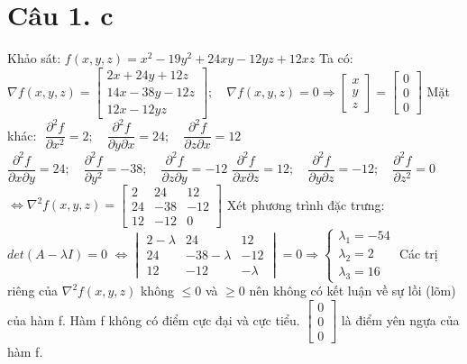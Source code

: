 \documentclass[11pt]{article}
\begin{document}
\section*{Câu 1. c}
Khảo sát: $ f(x, y, z) =  x^2 - 19y^2 + 24xy - 12yz + 12xz $
\newline Ta có: $ \nabla f(x, y, z) = \begin{bmatrix}
    2x + 24y + 12z \\
    14x - 38y - 12z \\
    12x - 12yz
\end{bmatrix}; \quad \nabla f(x, y, z) = 0 \Rightarrow \begin{bmatrix}
    x \\ y \\ z
\end{bmatrix} = \begin{bmatrix}
    0 \\
    0 \\
    0
\end{bmatrix} $
\newline Mặt khác: $ $
\newline $ \dfrac{\partial^2 f}{\partial x^2} = 2; \quad \dfrac{\partial^2 f}{\partial y \partial x} = 24; \quad \dfrac{\partial^2 f}{\partial z \partial x} = 12 $
\newline $ \dfrac{\partial^2 f}{\partial x \partial y} = 24; \quad \dfrac{\partial^2 f}{\partial y^2} = -38; \quad \dfrac{\partial^2 f}{\partial z \partial y} = -12 $
\newline $ \dfrac{\partial^2 f}{\partial x \partial z} = 12; \quad \dfrac{\partial^2 f}{\partial y \partial z} = -12; \quad \dfrac{\partial^2 f}{\partial z^2} = 0 $
\newline $ \Leftrightarrow \nabla^2 f(x, y, z) = \begin{bmatrix}
    2 & 24 & 12 \\
    24 & -38 & -12 \\
    12 & -12 & 0
\end{bmatrix} $
\newline Xét phương trình đặc trưng: $ det(A - \lambda I) = 0 $
\newline $ \Leftrightarrow \begin{vmatrix}
    2 - \lambda & 24 & 12 \\
    24 & -38 - \lambda & -12 \\
    12 & -12 & - \lambda
\end{vmatrix} = 0 \Rightarrow \begin{cases}
    \lambda_1 = -54 \\
    \lambda_2 = 2 \\
    \lambda_3 = 16
\end{cases} $
\newline Các trị riêng của $ \nabla^2 f(x, y, z) $ không $ \le 0 $ và $ \ge 0 $ nên không có kết luận về sự lồi (lõm) của hàm f.
\newline Hàm f không có điểm cực đại và cực tiểu. $ \begin{bmatrix}
    0 \\ 0 \\ 0
\end{bmatrix} $ là điểm yên ngựa của hàm f.
\end{document}

